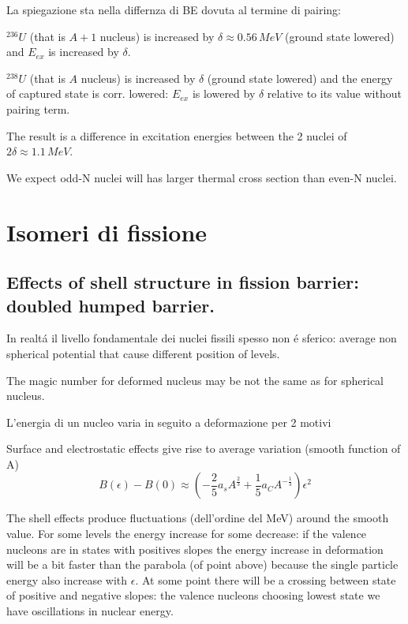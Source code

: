 La spiegazione sta nella differnza di BE dovuta al termine di pairing:

\begin{itemize*}
\item $^{236}U$ (that is $A+1$ nucleus) is increased by $\delta\approx0.56\,MeV$ (ground state lowered) and $E_{ex}$ is increased by $\delta$.
\item $^{238}U$ (that is $A$ nucleus) is increased by $\delta$ (ground state lowered) and the energy of captured state is corr. lowered: $E_{ex}$ is lowered by $\delta$ relative to its value without pairing term.
\end{itemize*}
The result is a difference in excitation energies between the 2 nuclei of $2\delta\approx1.1\,MeV$.

We expect odd-N nuclei will has larger thermal cross section than even-N nuclei.

\section{Isomeri di fissione}

\subsection{Effects of shell structure in fission barrier: doubled humped barrier.}

In realt\'a il livello fondamentale dei nuclei fissili spesso non \'e sferico: average non spherical potential that cause different position of levels.

The magic number for deformed nucleus may be not the same as for spherical nucleus.

L'energia di un nucleo varia in seguito a deformazione per 2 motivi
\begin{itemize*}
\item Surface and electrostatic effects give rise to average variation (smooth function of A)
\begin{equation*}
B(\epsilon)-B(0)\approx(-\frac{2}{5}a_sA^{\frac{2}{3}}+\frac{1}{5}a_CA^{-\frac{1}{3}})\epsilon^2
\end{equation*}

\item The shell effects produce fluctuations (dell'ordine del MeV) around the smooth value.
For some levels the energy increase for some decrease: if the valence nucleons are in states with positives slopes the energy increase in deformation will be a bit faster than the parabola (of point above) because the single particle energy also increase with $\epsilon$. At some point there will be a crossing between state of positive and negative slopes: the valence nucleons choosing lowest state we have oscillations in nuclear energy.
\end{itemize*}

